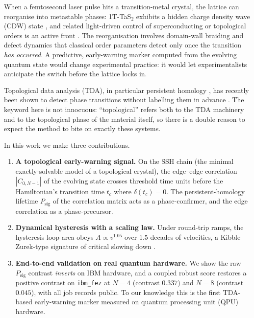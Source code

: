 \documentclass[11pt]{article}
\begin{document}
When a femtosecond laser pulse hits a transition-metal crystal, the lattice
can reorganise into metastable phases: 1T-TaS$_2$ exhibits a hidden charge
density wave (CDW) state \cite{Stojchevska2014,Vaskivskyi2016}, and related
light-driven control of superconducting or topological orders is an active
front \cite{Yoshida2014}. The reorganisation involves domain-wall braiding
and defect dynamics that classical order parameters detect only once the
transition \emph{has occurred}. A predictive, early-warning marker computed
from the evolving quantum state would change experimental practice: it
would let experimentalists anticipate the switch before the lattice locks
in.

Topological data analysis (TDA), in particular persistent homology
\cite{Edelsbrunner,Carlsson}, has recently been shown to detect phase
transitions without labelling them in advance \cite{Tran2021}. The keyword
here is not innocuous: ``topological'' refers both to the TDA machinery and
to the topological phase of the material itself, so there is a double
reason to expect the method to bite on exactly these systems.

In this work we make three contributions.

\begin{enumerate}
\item \textbf{A topological early-warning signal.} On the SSH chain (the
minimal exactly-solvable model of a topological crystal), the edge--edge
correlation $|C_{0,N-1}|$ of the evolving state crosses threshold
time units before the Hamiltonian's transition time $t_c$ where $\delta(t_c)=0$.
The persistent-homology lifetime $P_{\mathrm{sig}}$ of the correlation
matrix acts as a phase-confirmer, and the edge correlation as a
phase-precursor.
\item \textbf{Dynamical hysteresis with a scaling law.} Under round-trip
ramps, the hysteresis loop area obeys $A \propto v^{1.05}$ over 1.5 decades
of velocities, a Kibble--Zurek-type signature of critical slowing down
\cite{Kibble1976,Zurek1985,Dziarmaga2005}.
\item \textbf{End-to-end validation on real quantum hardware.} We show the
raw $P_{\mathrm{sig}}$ contrast \emph{inverts} on IBM hardware, and a
coupled robust score restores a positive contrast on \texttt{ibm\_fez} at
$N=4$ (contrast $0.337$) and $N=8$ (contrast $0.045$), with all job records
public. To our knowledge this is the first TDA-based early-warning marker
measured on quantum processing unit (QPU) hardware.
\end{enumerate}
\end{document}
